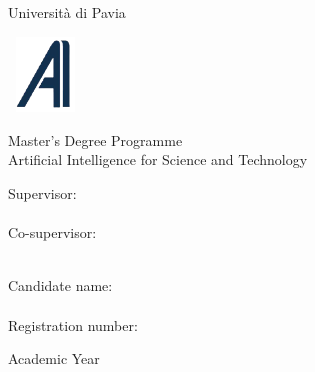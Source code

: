 \begin{titlepage}
\begin{center}
\begin{minipage}[t]{18cm}
\begin{center}
\begin{minipage}[t]{4cm}
\begin{center}
\Large Universit\`a %
di Pavia
\end{center}
\end{minipage}%
\end{center}%
\end{minipage}

\vskip 1.5cm

\begin{center}%
\begin{minipage}{2cm}%
\includegraphics[height=2cm,width=2cm]{logos/logo-ai4st-clear}%
\end{minipage}%
\begin{minipage}{12cm}%
\begin{center}%
\LARGE%
Master's Degree Programme \\
Artificial Intelligence for Science and Technology
\end{center}%
\end{minipage}%
\end{center}%


\vskip 2.5cm

\Huge
	\textbf{\printtitle}

\vskip 4.5cm

\Large

\begin{minipage}[t]{7cm}
	Supervisor:\\
	\printsupervisor \\
	Co-supervisor:\\
  	\printcosupervisor \\
\end{minipage}
\hfill
\begin{minipage}[t]{5cm}
	Candidate name:\\
	\printauthor\\
	Registration number:\\
    \regnumber
\end{minipage}

\vskip 1.0cm

	Academic Year \printacademicyear

\end{center}

\vfill
\eject
\end{titlepage}

\clearpage

\restoregeometry
